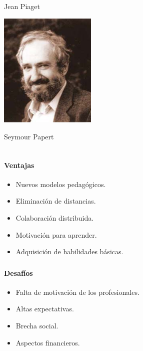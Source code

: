 \begin{frame}[c]
\begin{columns}
\begin{overprint}
	\centering
	Jean Piaget    
    
     \includegraphics[width=\textwidth, height=5.5cm]{imagenes/construccionismo} 

	\centering
	Seymour Papert    
    
\end{overprint}


\end{columns}


\end{frame}

\begin{frame}
    \frametitle{\pagetitle}
    \framesubtitle{Ventajas}
    \begin{itemize}[<+->]
        \item Nuevos modelos pedagógicos.
        \item Eliminación de distancias.
        \item Colaboración distribuida.
        \item Motivación para aprender.
        \item Adquisición de habilidades básicas.
    \end{itemize}
\end{frame}

\begin{frame}
    \frametitle{\pagetitle}
    \framesubtitle{Desafíos}
	 \begin{itemize}[<+->]
        \item Falta de motivación de los profesionales.
        \item Altas expectativas.
        \item Brecha social.
        \item Aspectos financieros.
    \end{itemize}
\end{frame}
